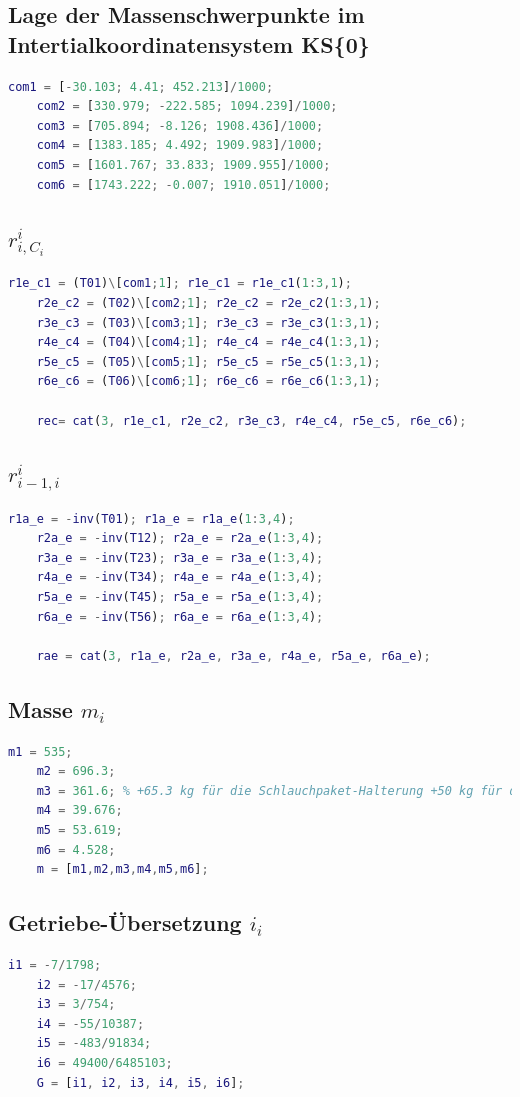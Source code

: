 \subsection{Lage der Massenschwerpunkte im Intertialkoordinatensystem KS\{0\}}
%
\begin{lstlisting}[language=Matlab, numbers=none]
	com1 = [-30.103; 4.41; 452.213]/1000;
	com2 = [330.979; -222.585; 1094.239]/1000;
	com3 = [705.894; -8.126; 1908.436]/1000;
	com4 = [1383.185; 4.492; 1909.983]/1000;
	com5 = [1601.767; 33.833; 1909.955]/1000;
	com6 = [1743.222; -0.007; 1910.051]/1000;
\end{lstlisting}
%
\subsection{$r^{i}_{i,C_i}$}
%
\begin{lstlisting}[language=Matlab, numbers=none]
	r1e_c1 = (T01)\[com1;1]; r1e_c1 = r1e_c1(1:3,1);
	r2e_c2 = (T02)\[com2;1]; r2e_c2 = r2e_c2(1:3,1);
	r3e_c3 = (T03)\[com3;1]; r3e_c3 = r3e_c3(1:3,1);
	r4e_c4 = (T04)\[com4;1]; r4e_c4 = r4e_c4(1:3,1);
	r5e_c5 = (T05)\[com5;1]; r5e_c5 = r5e_c5(1:3,1);
	r6e_c6 = (T06)\[com6;1]; r6e_c6 = r6e_c6(1:3,1);
	
	rec= cat(3, r1e_c1, r2e_c2, r3e_c3, r4e_c4, r5e_c5, r6e_c6);
\end{lstlisting}
%
\subsection{$r^{i}_{i-1,i}$}
%
\begin{lstlisting}[language=Matlab, numbers=none]
	r1a_e = -inv(T01); r1a_e = r1a_e(1:3,4);
	r2a_e = -inv(T12); r2a_e = r2a_e(1:3,4);
	r3a_e = -inv(T23); r3a_e = r3a_e(1:3,4);
	r4a_e = -inv(T34); r4a_e = r4a_e(1:3,4);
	r5a_e = -inv(T45); r5a_e = r5a_e(1:3,4);
	r6a_e = -inv(T56); r6a_e = r6a_e(1:3,4);
	
	rae = cat(3, r1a_e, r2a_e, r3a_e, r4a_e, r5a_e, r6a_e);
\end{lstlisting}
%
\subsection{Masse $m_i$}
%
\begin{lstlisting}[language=Matlab, numbers=none]
	m1 = 535;
	m2 = 696.3;
	m3 = 361.6; % +65.3 kg für die Schlauchpaket-Halterung +50 kg für die Antriebe 4 und 5;
	m4 = 39.676;
	m5 = 53.619;
	m6 = 4.528;
	m = [m1,m2,m3,m4,m5,m6];
\end{lstlisting}
%
\subsection{Getriebe-Übersetzung $i_i$}
%
\begin{lstlisting}[language=Matlab, numbers=none]
	i1 = -7/1798;
	i2 = -17/4576;
	i3 = 3/754;
	i4 = -55/10387;
	i5 = -483/91834;
	i6 = 49400/6485103;
	G = [i1, i2, i3, i4, i5, i6];
\end{lstlisting}
%
\setcounter{section}{2}
